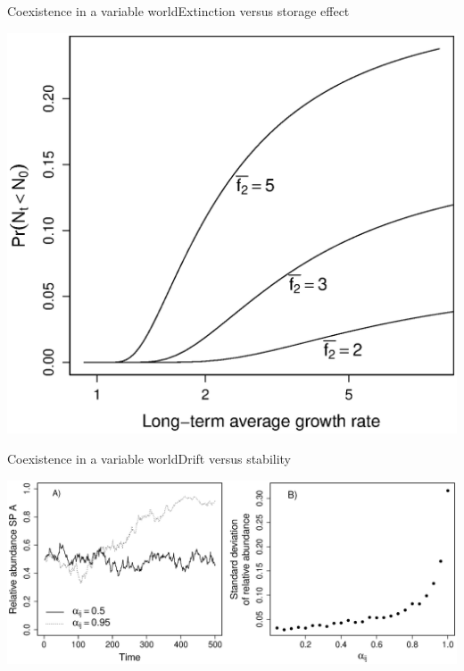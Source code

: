 \documentclass{eecslides}
\begin{document}
	\begin{frame}{Coexistence in a variable world}{Extinction versus storage effect}

		\begin{center}
			\includegraphics[height=0.7\textheight]{storage_extinction.eps}
		\end{center}

	\end{frame}


	\begin{frame}{Coexistence in a variable world}{Drift versus stability}

		\begin{center}
			\includegraphics[height=0.5\textheight]{drift_stab.eps}
		\end{center}

	\end{frame}
\end{document}
